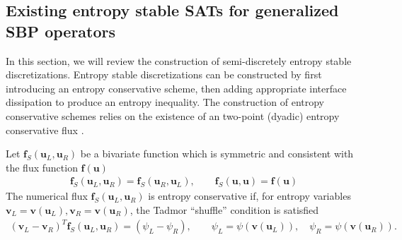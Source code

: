\documentclass[onefignum,onetabnum,final]{siamart171218}
\newcommand{\pd}[2]{\frac{\partial#1}{\partial#2}}
\newcommand{\LRp}[1]{\left( #1 \right)}
\newcommand{\LRl}[1]{\left. #1 \right|}
\newcommand{\diag}[1]{{\rm diag}\LRp{#1}}
\begin{document}
%


\subsection{Existing entropy stable SATs for generalized SBP operators}
\label{sec:gsbpsat}

In this section, we will review the construction of semi-discretely entropy stable discretizations.  Entropy stable discretizations can be constructed by first introducing an entropy conservative scheme, then adding appropriate interface dissipation to produce an entropy inequality.  The construction of entropy conservative schemes relies on the existence of an two-point (dyadic) entropy conservative flux \cite{tadmor1987numerical}.  
\begin{definition}
\label{def:tadmor}
Let $\bm{f}_S(\bm{u}_L,\bm{u}_R)$ be a bivariate function which is symmetric and consistent with the flux function $\bm{f}(\bm{u})$
\begin{align*}
\bm{f}_S(\bm{u}_L,\bm{u}_R) = \bm{f}_S(\bm{u}_R,\bm{u}_L), \qquad \bm{f}_S(\bm{u},\bm{u}) = \bm{f}(\bm{u})
\end{align*}
The numerical flux $\bm{f}_S(\bm{u}_L, \bm{u}_R)$ is entropy conservative if, for entropy variables $\bm{v}_L = \bm{v}(\bm{u}_L), \bm{v}_R = \bm{v}(\bm{u}_R)$, the Tadmor ``shuffle'' condition is satisfied
\begin{align*}
\LRp{\bm{v}_L - \bm{v}_R}^T \bm{f}_S(\bm{u}_L,\bm{u}_R) = (\psi_L - \psi_R), \qquad \psi_L = \psi(\bm{v}(\bm{u}_L)), \quad \psi_R = \psi(\bm{v}(\bm{u}_R)).  
\end{align*}
\end{definition}
\end{document}

